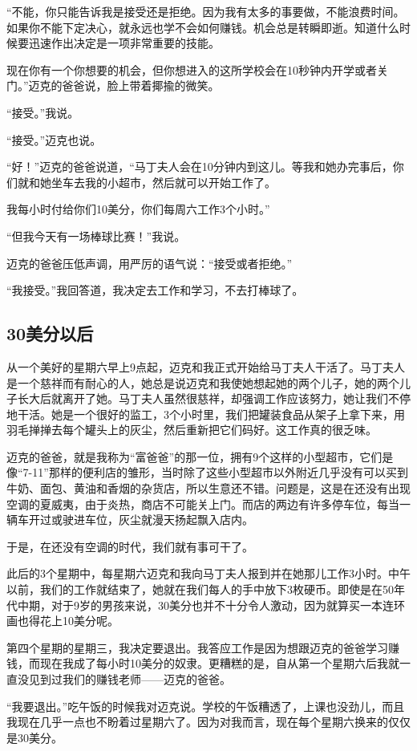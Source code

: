 “不能，你只能告诉我是接受还是拒绝。因为我有太多的事要做，不能浪费时间。如果你不能下定决心，就永远也学不会如何赚钱。机会总是转瞬即逝。知道什么时候要迅速作出决定是一项非常重要的技能。

现在你有一个你想要的机会，但你想进入的这所学校会在10秒钟内开学或者关门。”迈克的爸爸说，脸上带着揶揄的微笑。

“接受。”我说。

“接受。”迈克也说。

“好！”迈克的爸爸说道，“马丁夫人会在10分钟内到这儿。等我和她办完事后，你们就和她坐车去我的小超市，然后就可以开始工作了。

我每小时付给你们10美分，你们每周六工作3个小时。”

“但我今天有一场棒球比赛！”我说。

迈克的爸爸压低声调，用严厉的语气说：“接受或者拒绝。”

“我接受。”我回答道，我决定去工作和学习，不去打棒球了。

\subsection*{30美分以后}

从一个美好的星期六早上9点起，迈克和我正式开始给马丁夫人干活了。马丁夫人是一个慈祥而有耐心的人，她总是说迈克和我使她想起她的两个儿子，她的两个儿子长大后就离开了她。马丁夫人虽然很慈祥，却强调工作应该努力，她让我们不停地干活。她是一个很好的监工，3个小时里，我们把罐装食品从架子上拿下来，用羽毛掸掸去每个罐头上的灰尘，然后重新把它们码好。这工作真的很乏味。

迈克的爸爸，就是我称为“富爸爸”的那一位，拥有9个这样的小型超市，它们是像“7-11”那样的便利店的雏形，当时除了这些小型超市以外附近几乎没有可以买到牛奶、面包、黄油和香烟的杂货店，所以生意还不错。问题是，这是在还没有出现空调的夏威夷，由于炎热，商店不可能关上门。而店的两边有许多停车位，每当一辆车开过或驶进车位，灰尘就漫天扬起飘入店内。

于是，在还没有空调的时代，我们就有事可干了。

此后的3个星期中，每星期六迈克和我向马丁夫人报到并在她那儿工作3小时。中午以前，我们的工作就结束了，她就在我们每人的手中放下3枚硬币。即使是在50年代中期，对于9岁的男孩来说，30美分也并不十分令人激动，因为就算买一本连环画也得花上10美分呢。

第四个星期的星期三，我决定要退出。我答应工作是因为想跟迈克的爸爸学习赚钱，而现在我成了每小时10美分的奴隶。更糟糕的是，自从第一个星期六后我就一直没见到过我们的赚钱老师——迈克的爸爸。

“我要退出。”吃午饭的时候我对迈克说。学校的午饭糟透了，上课也没劲儿，而且我现在几乎一点也不盼着过星期六了。因为对我而言，现在每个星期六换来的仅仅是30美分。

